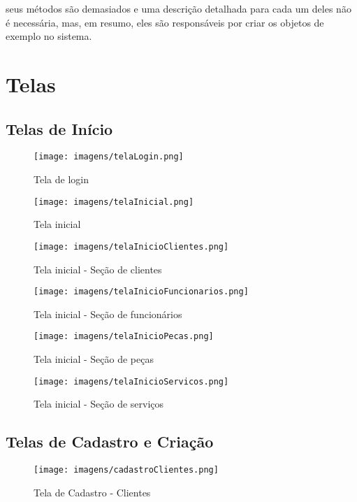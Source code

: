 \documentclass[a4paper,12pt]{article}
\begin{document}
\noindent seus métodos são demasiados e uma descrição detalhada para cada um deles não é necessária, mas, em resumo, eles são responsáveis por criar os objetos de exemplo no sistema.

\section{Telas}

\subsection{Telas de Início}
\begin{figure}[H]
    \centering
    \texttt{[image: imagens/telaLogin.png]}
    \caption{Tela de login}
\end{figure}

\begin{figure}[H]
    \centering
    \texttt{[image: imagens/telaInicial.png]}
    \caption{Tela inicial}
\end{figure}

\begin{figure}[H]
    \centering
    \texttt{[image: imagens/telaInicioClientes.png]}
    \caption{Tela inicial - Seção de clientes}
\end{figure}

\begin{figure}[H]
    \centering
    \texttt{[image: imagens/telaInicioFuncionarios.png]}
    \caption{Tela inicial - Seção de funcionários}
\end{figure}

\begin{figure}[H]
    \centering
    \texttt{[image: imagens/telaInicioPecas.png]}
    \caption{Tela inicial - Seção de peças}
\end{figure}

\begin{figure}[H]
    \centering
    \texttt{[image: imagens/telaInicioServicos.png]}
    \caption{Tela inicial - Seção de serviços}
\end{figure}

\subsection{Telas de Cadastro e Criação}

\begin{figure}[H]
    \centering
    \texttt{[image: imagens/cadastroClientes.png]}
    \caption{Tela de Cadastro - Clientes}
\end{figure}
\end{document}
